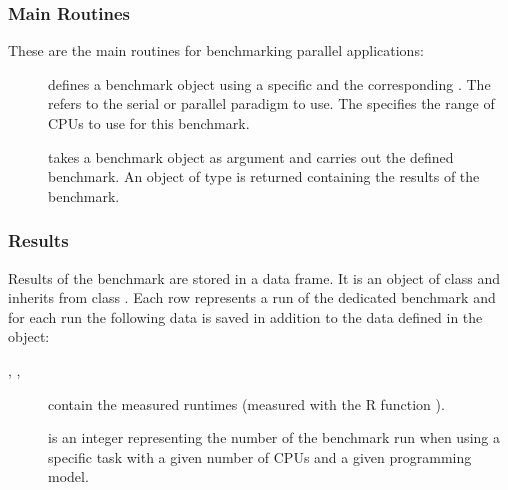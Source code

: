 \subsubsection{Main Routines}

These are the main routines for benchmarking parallel applications:

\begin{description}
\item[]
  defines a benchmark object using a specific  and the
  corresponding . The  refers to the serial or
  parallel paradigm to use. The  specifies the range
  of CPUs to use for this benchmark. 
\item[] takes a benchmark object as argument
  and carries out the defined benchmark. An object of type
   is returned containing the
  results of the benchmark.
\end{description}

\subsubsection{Results}

Results of the benchmark are stored in a data frame. It is an object
of class  and inherits from class
. Each row represents a run of the dedicated
benchmark and for each run the following data is saved in addition to
the data defined in the  object:
\begin{description}
\item[, , ] contain the
  measured runtimes 
  (measured with the R function ). 
\item[] is an integer representing the number of the
  benchmark run when using a specific task with a given number of CPUs
  and a given programming model.
\end{description} 

